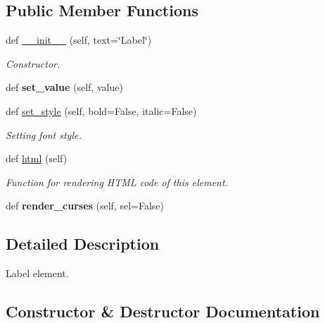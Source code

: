 \subsection*{Public Member Functions}
\begin{DoxyCompactItemize}
\item 
def \hyperlink{classwax_1_1Components_1_1WLabel_a36220e24b690fec62b8c8c38a0c8d9c3}{\+\_\+\+\_\+init\+\_\+\+\_\+} (self, text=\char`\"{}Label\char`\"{})
\begin{DoxyCompactList}\small\item\em Constructor. \end{DoxyCompactList}\item 
def {\bfseries set\+\_\+value} (self, value)\hypertarget{classwax_1_1Components_1_1WLabel_a171e82f31486f1e5d25fce5d6368b04b}{}\label{classwax_1_1Components_1_1WLabel_a171e82f31486f1e5d25fce5d6368b04b}

\item 
def \hyperlink{classwax_1_1Components_1_1WLabel_a674a083f20dad3bae26a691b2e020028}{set\+\_\+style} (self, bold=False, italic=False)
\begin{DoxyCompactList}\small\item\em Setting font style. \end{DoxyCompactList}\item 
def \hyperlink{classwax_1_1Components_1_1WLabel_a61037e48c8f371f7270702258890e918}{html} (self)
\begin{DoxyCompactList}\small\item\em Function for rendering H\+T\+ML code of this element. \end{DoxyCompactList}\item 
def {\bfseries render\+\_\+curses} (self, sel=False)\hypertarget{classwax_1_1Components_1_1WLabel_a5f468ed72b4f54f02ea981a4e2a72536}{}\label{classwax_1_1Components_1_1WLabel_a5f468ed72b4f54f02ea981a4e2a72536}

\end{DoxyCompactItemize}


\subsection{Detailed Description}
Label element. 

\subsection{Constructor \& Destructor Documentation}
